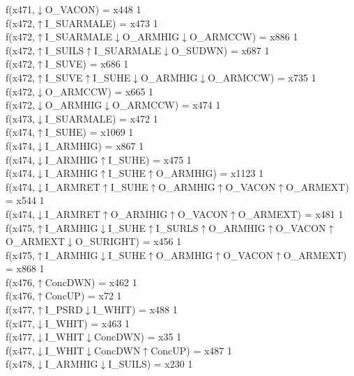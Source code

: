 f(x471,$\downarrow$O\_VACON) = x448 {1} \\
f(x472,$\uparrow$I\_SUARMALE) = x473 {1} \\
f(x472,$\uparrow$I\_SUARMALE$\downarrow$O\_ARMHIG$\downarrow$O\_ARMCCW) = x886 {1} \\
f(x472,$\uparrow$I\_SUILS$\uparrow$I\_SUARMALE$\downarrow$O\_SUDWN) = x687 {1} \\
f(x472,$\uparrow$I\_SUVE) = x686 {1} \\
f(x472,$\uparrow$I\_SUVE$\uparrow$I\_SUHE$\downarrow$O\_ARMHIG$\downarrow$O\_ARMCCW) = x735 {1} \\
f(x472,$\downarrow$O\_ARMCCW) = x665 {1} \\
f(x472,$\downarrow$O\_ARMHIG$\downarrow$O\_ARMCCW) = x474 {1} \\
f(x473,$\downarrow$I\_SUARMALE) = x472 {1} \\
f(x474,$\uparrow$I\_SUHE) = x1069 {1} \\
f(x474,$\downarrow$I\_ARMHIG) = x867 {1} \\
f(x474,$\downarrow$I\_ARMHIG$\uparrow$I\_SUHE) = x475 {1} \\
f(x474,$\downarrow$I\_ARMHIG$\uparrow$I\_SUHE$\uparrow$O\_ARMHIG) = x1123 {1} \\
f(x474,$\downarrow$I\_ARMRET$\uparrow$I\_SUHE$\uparrow$O\_ARMHIG$\uparrow$O\_VACON$\uparrow$O\_ARMEXT) = x544 {1} \\
f(x474,$\downarrow$I\_ARMRET$\uparrow$O\_ARMHIG$\uparrow$O\_VACON$\uparrow$O\_ARMEXT) = x481 {1} \\
f(x475,$\uparrow$I\_ARMHIG$\downarrow$I\_SUHE$\uparrow$I\_SURLS$\uparrow$O\_ARMHIG$\uparrow$O\_VACON$\uparrow$O\_ARMEXT$\downarrow$O\_SURIGHT) = x456 {1} \\
f(x475,$\uparrow$I\_ARMHIG$\downarrow$I\_SUHE$\uparrow$O\_ARMHIG$\uparrow$O\_VACON$\uparrow$O\_ARMEXT) = x868 {1} \\
f(x476,$\uparrow$ConcDWN) = x462 {1} \\
f(x476,$\uparrow$ConcUP) = x72 {1} \\
f(x477,$\uparrow$I\_PSRD$\downarrow$I\_WHIT) = x488 {1} \\
f(x477,$\downarrow$I\_WHIT) = x463 {1} \\
f(x477,$\downarrow$I\_WHIT$\downarrow$ConcDWN) = x35 {1} \\
f(x477,$\downarrow$I\_WHIT$\downarrow$ConcDWN$\uparrow$ConcUP) = x487 {1} \\
f(x478,$\downarrow$I\_ARMHIG$\downarrow$I\_SUILS) = x230 {1} \\
